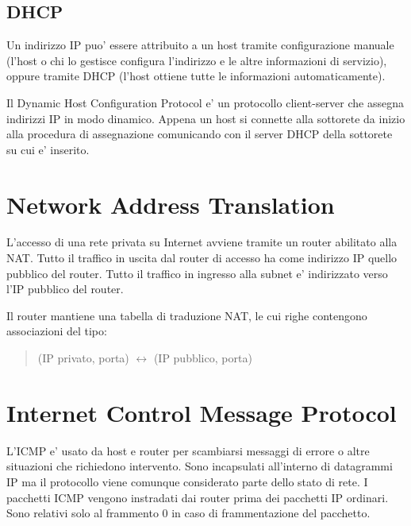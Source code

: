 \subsection{DHCP}
Un indirizzo IP puo' essere attribuito a un host tramite configurazione manuale (l'host o chi lo gestisce configura l'indirizzo e le altre informazioni di servizio), oppure tramite DHCP (l'host ottiene tutte le informazioni automaticamente).

Il Dynamic Host Configuration Protocol e' un protocollo client-server che assegna indirizzi IP in modo dinamico.
Appena un host si connette alla sottorete da inizio alla procedura di assegnazione comunicando con il server DHCP della sottorete su cui e' inserito.
\section{Network Address Translation}
L'accesso di una rete privata su Internet avviene tramite un router abilitato alla NAT.
Tutto il traffico in uscita dal router di accesso ha come indirizzo IP quello pubblico del router.
Tutto il traffico in ingresso alla subnet e' indirizzato verso l'IP pubblico del router.

Il router mantiene una tabella di traduzione NAT, le cui righe contengono associazioni del tipo:
\begin{quote}
    (IP privato, porta) $\leftrightarrow$ (IP pubblico, porta)
\end{quote}
\section{Internet Control Message Protocol}
L'ICMP e' usato da host e router per scambiarsi messaggi di errore o altre situazioni che richiedono intervento.
Sono incapsulati all'interno di datagrammi IP ma il protocollo viene comunque considerato parte dello stato di rete.
I pacchetti ICMP vengono instradati dai router prima dei pacchetti IP ordinari.
Sono relativi solo al frammento 0 in caso di frammentazione del pacchetto.
